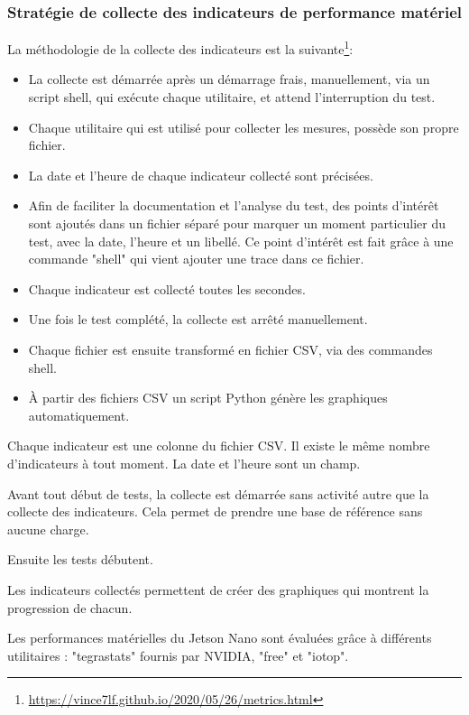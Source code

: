 \subsubsection{Stratégie de collecte des indicateurs de performance matériel}
\par La méthodologie de la collecte des indicateurs est la suivante\footnote{\url{https://vince7lf.github.io/2020/05/26/metrics.html}}: 
\begin{itemize}    
    \item La collecte est démarrée après un démarrage frais, manuellement, via un script shell, qui exécute chaque utilitaire, et attend l'interruption du test. 
    \item Chaque utilitaire qui est utilisé pour collecter les mesures, possède son propre fichier.
    \item La date et l'heure de chaque indicateur collecté sont précisées.
    \item Afin de faciliter la documentation et l'analyse du test, des points d'intérêt sont ajoutés dans un fichier séparé pour marquer un moment particulier du test, avec la date, l'heure et un libellé. Ce point d'intérêt est fait grâce à une commande "shell" qui vient ajouter une trace dans ce fichier.
    \item Chaque indicateur est collecté toutes les secondes.  
    \item Une fois le test complété, la collecte est arrêté manuellement. 
    \item Chaque fichier est ensuite transformé en fichier CSV, via des commandes shell.
    \item À partir des fichiers CSV un script Python génère les graphiques automatiquement. 
\end{itemize}
\par Chaque indicateur est une colonne du fichier CSV. Il existe le même nombre d'indicateurs à tout moment. La date et l'heure sont un champ. 
\par Avant tout début de tests, la collecte est démarrée sans activité autre que la collecte des indicateurs. Cela permet de prendre une base de référence sans aucune charge.
\par Ensuite les tests débutent. 
\par Les indicateurs collectés permettent de créer des graphiques qui montrent la progression de chacun.
\par Les performances matérielles du Jetson Nano sont évaluées grâce à différents utilitaires : "tegrastats" fournis par NVIDIA, "free" et "iotop".
